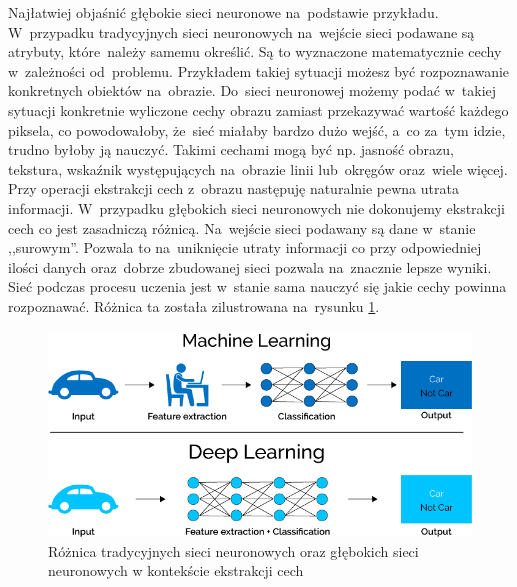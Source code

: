 Najłatwiej objaśnić głębokie sieci neuronowe na~podstawie przykładu. W~przypadku tradycyjnych sieci neuronowych na~wejście sieci podawane są atrybuty, które~należy samemu określić. Są to wyznaczone matematycznie cechy w~zależności od~problemu. Przykładem takiej sytuacji możesz być rozpoznawanie konkretnych obiektów na~obrazie. Do~sieci neuronowej możemy podać w~takiej sytuacji konkretnie wyliczone cechy obrazu zamiast przekazywać wartość każdego piksela, co powodowałoby, że~sieć miałaby bardzo dużo wejść, a~co za~tym idzie, trudno byłoby ją nauczyć. Takimi cechami mogą być np. jasność obrazu, tekstura, wskaźnik występujących na~obrazie linii lub~okręgów oraz~wiele więcej. Przy operacji ekstrakcji cech z~obrazu następuję naturalnie pewna utrata informacji. W~przypadku głębokich sieci neuronowych nie dokonujemy ekstrakcji cech co jest zasadniczą różnicą. Na~wejście sieci podawany są dane w~stanie ,,surowym''. Pozwala to na~uniknięcie utraty informacji co przy odpowiedniej ilości danych oraz~dobrze zbudowanej sieci pozwala na~znacznie lepsze wyniki. Sieć podczas procesu uczenia jest w~stanie sama nauczyć się jakie cechy powinna rozpoznawać. Różnica ta została zilustrowana na~rysunku \ref{dnnDiff}.

\begin{figure}[ht!]
\centering
\includegraphics[scale=0.5]{res/dnn1.png}
\caption[Caption for LOF]{Różnica tradycyjnych sieci neuronowych oraz głębokich sieci neuronowych w kontekście ekstrakcji cech\label{dnnDiff}\footnotemark} 
\end{figure}

